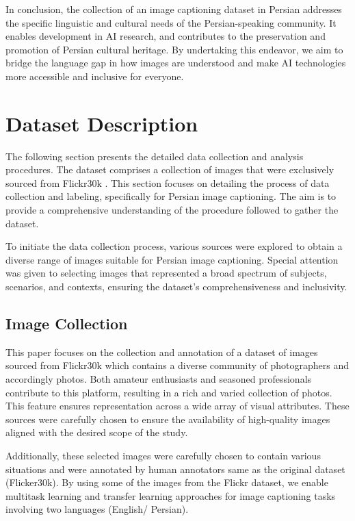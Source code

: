 \documentclass[runningheads]{llncs}
\begin{document}
In conclusion, the collection of an image captioning dataset in Persian addresses the specific linguistic and cultural needs of the Persian-speaking community. It enables development in AI research, and contributes to the preservation and promotion of Persian cultural heritage. By undertaking this endeavor, we aim to bridge the language gap in how images are understood and make AI technologies more accessible and inclusive for everyone.

\section{Dataset Description}
The following section presents the detailed data collection and analysis procedures. The dataset comprises a collection of images that were exclusively sourced from Flickr30k \cite{Flickr30k}. This section focuses on detailing the process of data collection and labeling, specifically for Persian image captioning. The aim is to provide a comprehensive understanding of the procedure followed to gather the dataset.

To initiate the data collection process, various sources were explored to obtain a diverse range of images suitable for Persian image captioning. Special attention was given to selecting images that represented a broad spectrum of subjects, scenarios, and contexts, ensuring the dataset's comprehensiveness and inclusivity.


\subsection{Image Collection}
This paper focuses on the collection and annotation of a dataset of images sourced from Flickr30k \cite{Flickr30k} which contains a diverse community of photographers and accordingly photos. Both amateur enthusiasts and seasoned professionals contribute to this platform, resulting in a rich and varied collection of photos. This feature ensures representation across a wide array of visual attributes. These sources were carefully chosen to ensure the availability of high-quality images aligned with the desired scope of the study.

Additionally, these selected images were carefully chosen to contain various situations and were annotated by human annotators same as the original dataset (Flicker30k). By using some of the images from the Flickr dataset, we enable multitask learning and transfer learning approaches for image captioning tasks involving two languages (English/ Persian).
\end{document}
